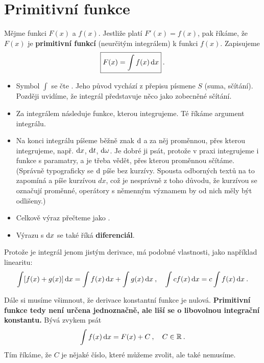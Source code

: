 \section{Primitivní funkce}

Mějme funkci $F(x)$ a $f(x)$. Jestliže platí $F'(x) = f(x)$, pak říkáme, že $F(x)$ je \textbf{primitivní funkcí} (neurčitým integrálem) k funkci $f(x)$. Zapisujeme \begin{align}
    \boxed{ F(x) = \int f(x) \, \mathrm{d} x } \:.
\end{align}
\begin{itemize}
    \item Symbol $\int$ se čte . Jeho původ vychází z přepisu písmene $S$ (suma, sčítání). Později uvidíme, že integrál představuje něco jako zobecněné sčítání.
    \item Za integrálem následuje funkce, kterou integrujeme. Té říkáme argument integrálu.
    \item Na konci integrálu píšeme běžně znak $\mathrm{d}$ a za něj proměnnou, přes kterou integrujeme, např. $\mathrm{d} x$, $\mathrm{d} t$, $\mathrm{d} \omega$. Je dobré ji psát, protože v praxi integrujeme i funkce s paramatry, a je třeba vědět, přes kterou proměnnou sčítáme. (Správně typograficky se $\mathrm{d}$ píše bez kurzívy. Spousta odborných textů na to zapomíná a píše kurzívou $dx$, což je nesprávně z toho důvodu, že kurzívou se označují proměnné, operátory s němenným významem by od nich měly být odlišeny.)
    \item Celkově výraz přečteme jako .
    \item Výrazu s $\mathrm{d} x$ se také říká \textbf{diferenciál}.
\end{itemize}

Protože je integrál jenom jistým  derivace, má podobné vlastnosti, jako například linearitu:
    \begin{align}
        \int [ f(x)+g(x) ] \, \mathrm{d} x = \int f(x) \, \mathrm{d} x + \int g(x) \, \mathrm{d} x \:, \quad \int c f(x) \, \mathrm{d} x = c \int f (x) \, \mathrm{d} x \:.
    \end{align}

Dále si musíme všimnout, že derivace konstantní funkce je nulová. \textbf{Primitivní funkce tedy není určena jednoznačně, ale liší se o libovolnou integrační konstantu.} Bývá zvykem psát
\begin{align}
    \int f(x) \, \mathrm{d} x = F(x) + C \:, \quad C \in \mathbb{R} \:.
\end{align}
Tím říkáme, že $C$ je nějaké číslo, které můžeme zvolit, ale také nemusíme.

